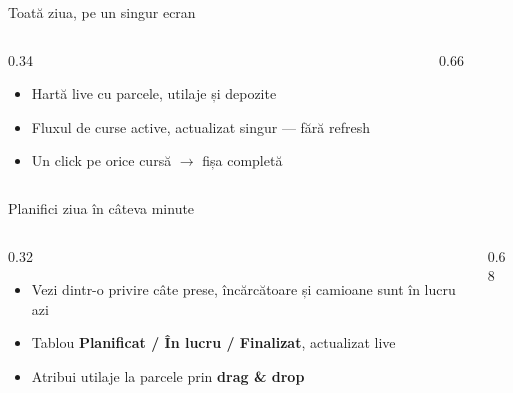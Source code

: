 \documentclass[aspectratio=169,10pt]{beamer}
\begin{document}
\begin{frame}{Toată ziua, pe un singur ecran}
  \begin{columns}[T]
    \begin{column}{0.34\linewidth}
      \vspace{0.3cm}
      \begin{itemize}
        \item Hartă live cu parcele, utilaje și depozite
        \item Fluxul de curse active, actualizat singur — fără refresh
        \item Un click pe orice cursă $\rightarrow$ fișa completă
      \end{itemize}
    \end{column}
    \begin{column}{0.66\linewidth}
    \end{column}
  \end{columns}
\end{frame}

\begin{frame}{Planifici ziua în câteva minute}
  \begin{columns}[T]
    \begin{column}{0.32\linewidth}
      \vspace{0.3cm}
      \begin{itemize}
        \item Vezi dintr-o privire câte prese, încărcătoare și camioane sunt în lucru azi
        \item Tablou \textbf{Planificat / În lucru / Finalizat}, actualizat live
        \item Atribui utilaje la parcele prin \textbf{drag \& drop}
      \end{itemize}
    \end{column}
    \begin{column}{0.68\linewidth}
    \end{column}
  \end{columns}
\end{frame}
\end{document}
